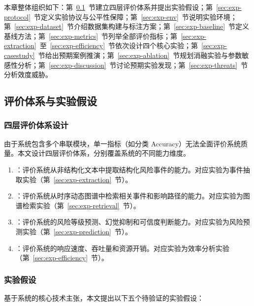 本章整体组织如下：第~\ref{sec:exp-framework}~节建立四层评价体系并提出实验假设；第~\ref{sec:exp-protocol}~节定义实验协议与公平性保障；第~\ref{sec:exp-env}~节说明实验环境；第~\ref{sec:exp-dataset}~节介绍数据集构建与标注方案；第~\ref{sec:exp-baseline}~节定义基线方法；第~\ref{sec:exp-metrics}~节列举全部评价指标；第~\ref{sec:exp-extraction}~至~\ref{sec:exp-efficiency}~节依次设计四个核心实验；第~\ref{sec:exp-casestudy}~节给出预期案例推演；第~\ref{sec:exp-ablation}~节规划消融实验与参数敏感性分析；第~\ref{sec:exp-discussion}~节讨论预期实验发现；第~\ref{sec:exp-threats}~节分析效度威胁。

\subsection{评价体系与实验假设}
\label{sec:exp-framework}

\subsubsection{四层评价体系设计}

由于\projectshort 系统包含多个串联模块，单一指标（如分类 Accuracy）无法全面评价系统质量。本文设计四层评价体系，分别覆盖系统的不同能力维度。

\begin{enumerate}
    \item {}：评价系统从非结构化文本中提取结构化风险事件的能力。对应实验为事件抽取实验（第~\ref{sec:exp-extraction}~节）。
    \item {}：评价系统从时序动态图谱中检索相关事件和影响路径的能力。对应实验为图谱检索实验（第~\ref{sec:exp-retrieval}~节）。
    \item {}：评价系统的风险等级预测、幻觉抑制和可信度判断能力。对应实验为风险预测实验（第~\ref{sec:exp-prediction}~节）。
    \item {}：评价系统的响应速度、吞吐量和资源开销。对应实验为效率分析实验（第~\ref{sec:exp-efficiency}~节）。
\end{enumerate}

\subsubsection{实验假设}

基于\projectshort 系统的核心技术主张，本文提出以下五个待验证的实验假设：

